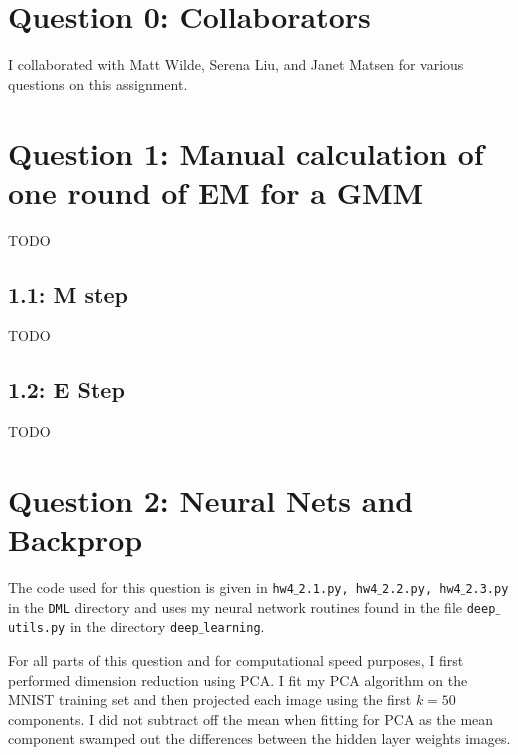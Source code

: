 \documentclass[12pt]{amsart}
\begin{document}
\section*{Question 0: Collaborators}
I collaborated with Matt Wilde, Serena Liu, and Janet Matsen for various questions on this assignment.

\section*{Question 1: Manual calculation of one round of EM for a GMM}

TODO

\subsection*{1.1: M step}

TODO

\subsection*{1.2: E Step}

TODO

\section{Question 2: Neural Nets and Backprop}
The code used for this question is given in {\tt hw4$\_$2.1.py, hw4$\_$2.2.py, hw4$\_$2.3.py} in the {\tt DML} directory and uses my neural network routines found in the file {\tt deep$\_$utils.py} in the directory {\tt deep$\_$learning}.

For all parts of this question and for computational speed purposes, I first performed dimension reduction using PCA.  I fit my PCA algorithm on the MNIST training set and then projected each image using the first $k = 50$ components.  I did not subtract off the mean when fitting for PCA as the mean component swamped out the differences between the hidden layer weights images.  
\end{document}
